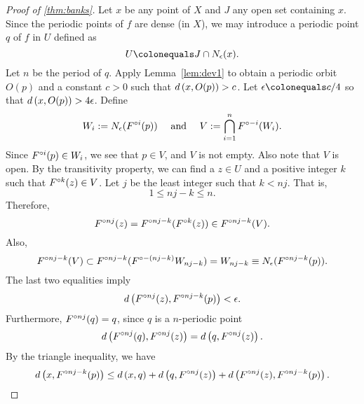 \documentclass[12pt,draft,twoside]{book}
\begin{document}
  \begin{proof}[Proof of \ref{thm:banks}]
    Let $x$ be any point of $X$ and $J$ any open set containing $x$.
    Since the periodic points of $f$ are dense (in $X$), we may introduce a periodic point
    $q$ of $f$ in $U$ defined as
    \begin{equation*}
      U \ceq J\cap \oball{\epsilon}{x}.
    \end{equation*}
    Let $n$ be the period of $q$.
    Apply Lemma~\ref{lem:dev1} to obtain a periodic orbit $O(p)$ and a constant $c > 0$ such that $d\left( x, O(p) \right) > c$.
    Let $\epsilon \ceq c/4$ so that $d\left( x, O(p) \right) > 4\epsilon$.
    Define
    \begin{equation*}
      W_i := N_\epsilon(F^{\circ i}(p)) \quad\text{ and }\quad V := \bigcap\limits_{i = 1}^{n} F^{\circ -i}(W_i).
    \end{equation*}
    Since $F^{\circ i}(p) \in W_i$, we see that $p \in V$, and $V$ is not empty. 
    Also note that $V$ is open.
    By the transitivity property, we can find a $z\in U$ and a positive integer $k$ such that
    $F^{\circ k}(z) \in V$. Let $j$ be the least integer such that $k < nj$. 
    That is,
    \begin{equation*}
      1 \leq nj - k \leq n.
    \end{equation*}
    Therefore,
    \begin{equation*}
      F^{\circ nj} (z) = F^{\circ nj - k} (F^{\circ k}(z)) \in F^{\circ nj-k}(V).
    \end{equation*}
    Also,
    \begin{equation*}
       F^{\circ nj - k}(V) \subset F^{\circ nj - k}(F^{\circ -(nj - k)} W_{nj-k}) 
       = W_{nj-k}
       \equiv N_\epsilon(F^{\circ nj-k}(p)).
    \end{equation*}
    The last two equalities imply
    \begin{equation*}
      d\left( F^{\circ nj}(z), F^{\circ nj - k}(p) \right) < \epsilon.
    \end{equation*}
    Furthermore, $F^{\circ nj}(q) = q$, since $q$ is a $n$-periodic point 
    \begin{equation*}
      d\left( F^{\circ nj}(q), F^{\circ nj}(z) \right) = d\left( q, F^{\circ nj}(z) \right).
    \end{equation*}
    By the triangle inequality, we have
    \begin{equation*}
      d\left( x, F^{\circ nj-k}(p) \right) \leq d\left( x,q \right) + d\left( q, F^{\circ nj}(z) \right) + d\left( F^{\circ nj}(z), F^{\circ nj - k}(p) \right).
    \end{equation*}

\end{proof}
\end{document}
